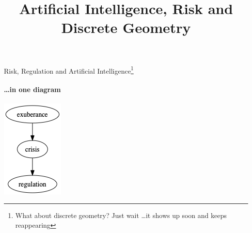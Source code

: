
\title{Artificial Intelligence, Risk and Discrete Geometry}

\maketitle

\begin{frame}{Risk, Regulation and Artificial Intelligence\footnote{What about discrete geometry? Just wait \ldots it shows up soon and keeps reappearing}}
  \framesubtitle{\ldots in one diagram}
  \begin{center}
    \includegraphics[width=0.3\textheight]{graphics/exuberance-crisis-regulation}
  \end{center}
\end{frame}

